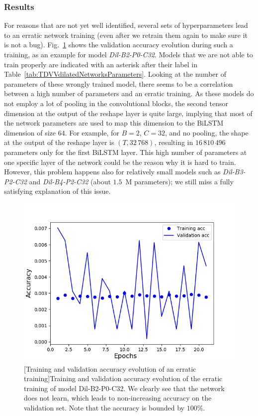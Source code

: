 \subsubsection{Results}

For reasons that are not yet well identified, several sets of hyperparameters lead to an erratic network training (even after we retrain them again to make sure it is not a bug). Fig.~\ref{fig:erraticTraining} shows the validation accuracy evolution during such a training, as an example for model \textit{Dil-B2-P0-C32}. Models that we are not able to train properly are indicated with an asterisk after their label in Table~\ref{tab:TDVVdilatedNetworksParameters}. Looking at the number of parameters of these wrongly trained model, there seems to be a correlation between a high number of parameters and an erratic training. As these models do not employ a lot of pooling in the convolutional blocks, the second tensor dimension at the output of the reshape layer is quite large, implying that most of the network parameters are used to map this dimension to the BiLSTM dimension of size $64$. For example, for $B=2$, $C=32$, and no pooling, the shape at the output of the reshape layer is $(T,32\,768)$, resulting in $16\,810\,496$ parameters only for the first BiLSTM layer. This high number of parameters at one specific layer of the network could be the reason why it is hard to train. However, this problem happens also for relatively small models such as \textit{Dil-B3-P2-C32} and \textit{Dil-B4-P2-C32} (about $1.5$~M parameters); we still miss a fully satisfying explanation of this issue.

\begin{figure}[t]
    \begin{center}
    \includegraphics[width=0.4\linewidth]{Images/chap6/erraticTraining.png}
    [Training and validation accuracy evolution of an erratic training]{Training and validation accuracy evolution of the erratic training of model Dil-B2-P0-C32. We clearly see that the network does not learn, which leads to non-increasing accuracy on the validation set. Note that the accuracy is bounded by $100$\%.}
    \label{fig:erraticTraining}
    \end{center}
\end{figure}

